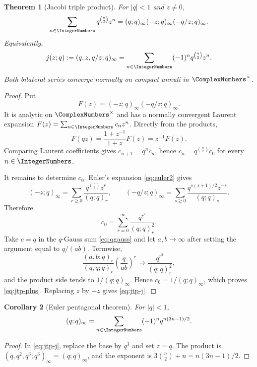 \documentclass[11pt]{article}
\numberwithin{equation}{section}
\newtheorem{theorem}{Theorem}[section]
\newtheorem{corollary}[theorem]{Corollary}
\theoremstyle{definition}
\theoremstyle{remark}
\begin{document}
\begin{theorem}[Jacobi triple product]\label{thm:jtp}
For $|q|<1$ and $z\ne0$,
\begin{equation}\label{eq:jtp-plus}
\sum_{n\in\IntegerNumbers}q^{\binom n2}z^n
=(q;q)_\infty(-z;q)_\infty(-q/z;q)_\infty.
\end{equation}
Equivalently,
\begin{equation}\label{eq:jtp-j}
 j(z;q):=(q,z,q/z;q)_\infty
 =\sum_{n\in\IntegerNumbers}(-1)^nq^{\binom n2}z^n.
\end{equation}
Both bilateral series converge normally on compact annuli in $\ComplexNumbers^\times$.
\end{theorem}
\begin{proof}
Put
\[
F(z)=(-z;q)_\infty(-q/z;q)_\infty.
\]
It is analytic on $\ComplexNumbers^\times$ and has a normally convergent Laurent expansion
$F(z)=\sum_{n\in\IntegerNumbers}c_nz^n$.  Directly from the products,
\[
F(qz)=\frac{1+z^{-1}}{1+z}F(z)=z^{-1}F(z).
\]
Comparing Laurent coefficients gives
$c_{n+1}=q^n c_n$, hence
$c_n=q^{\binom n2}c_0$ for every $n\in\IntegerNumbers$.

It remains to determine $c_0$.  Euler's expansion \eqref{eq:euler2} gives
\[
(-z;q)_\infty=\sum_{r\ge0}\frac{q^{\binom r2}z^r}{(q;q)_r},
\qquad
(-q/z;q)_\infty=\sum_{s\ge0}
 \frac{q^{s(s+1)/2}z^{-s}}{(q;q)_s}.
\]
Therefore
\[
c_0=\sum_{r=0}^{\infty}\frac{q^{r^2}}{(q;q)_r^2}.
\]
Take $c=q$ in the $q$-Gauss sum \eqref{eq:qgauss} and let
$a,b\to\infty$ after setting the argument equal to $q/(ab)$.  Termwise,
\[
\frac{(a,b;q)_r}{(q,q;q)_r}\left(\frac{q}{ab}\right)^r
\longrightarrow\frac{q^{r^2}}{(q;q)_r^2},
\]
and the product side tends to $1/(q;q)_\infty$.  Hence
$c_0=1/(q;q)_\infty$, which proves \eqref{eq:jtp-plus}.  Replacing $z$ by
$-z$ gives \eqref{eq:jtp-j}.
\end{proof}

\begin{corollary}[Euler pentagonal theorem]\label{cor:pentagonal}
For $|q|<1$,
\begin{equation}\label{eq:pentagonal}
(q;q)_\infty=\sum_{n\in\IntegerNumbers}(-1)^nq^{n(3n-1)/2}.
\end{equation}
\end{corollary}
\begin{proof}
In \eqref{eq:jtp-j}, replace the base by $q^3$ and set $z=q$.  The product is
$(q,q^2,q^3;q^3)_\infty=(q;q)_\infty$, and the exponent is
$3\binom n2+n=n(3n-1)/2$.
\end{proof}
\end{document}
